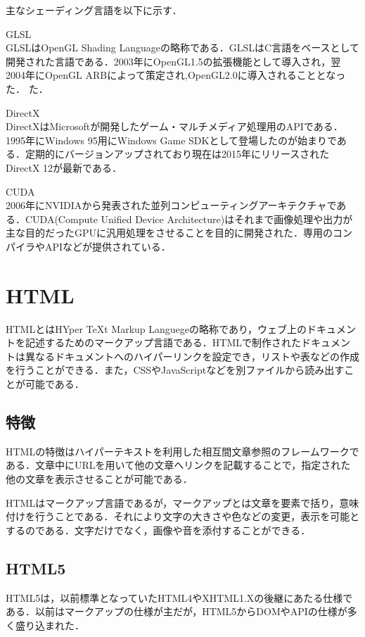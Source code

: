 \documentclass[a4j,12pt]{jsarticle}
\begin{document}
主なシェーディング言語を以下に示す．
\begin{description}
\item {GLSL}\mbox{}\\ 
GLSLはOpenGL  Shading Languageの略称である．GLSLはC言語をベースとして開発された言語である．2003年にOpenGL1.5の拡張機能として導入され，翌2004年にOpenGL ARBによって策定され,OpenGL2.0に導入されることとなった．
た．

\item	{DirectX}\mbox{}\\ 
DirectXはMicrosoftが開発したゲーム・マルチメディア処理用のAPIである．
1995年にWindows 95用にWindows Game SDKとして登場したのが始まりである．定期的にバージョンアップされており現在は2015年にリリースされたDirectX 12が最新である．

\item	{CUDA }\mbox{}\\ 
 2006年にNVIDIAから発表された並列コンピューティングアーキテクチャである．CUDA(Compute Unified Device Architecture)はそれまで画像処理や出力が主な目的だったGPUに汎用処理をさせることを目的に開発された．専用のコンパイラやAPIなどが提供されている．
\end{description}
\newpage

\section{HTML}
HTMLとはHYper TeXt Markup Languegeの略称であり，ウェブ上のドキュメントを記述するためのマークアップ言語である．HTMLで制作されたドキュメントは異なるドキュメントへのハイパーリンクを設定でき，リストや表などの作成を行うことができる．また，CSSやJavaScriptなどを別ファイルから読み出すことが可能である．
\subsection{特徴}
HTMLの特徴はハイパーテキストを利用した相互間文章参照のフレームワークである．文章中にURLを用いて他の文章へリンクを記載することで，指定された他の文章を表示させることが可能である．

HTMLはマークアップ言語であるが，マークアップとは文章を要素で括り，意味付けを行うことである．それにより文字の大きさや色などの変更，表示を可能とするのである．文字だけでなく，画像や音を添付することができる．

\subsection{HTML5}
HTML5は，以前標準となっていたHTML4やXHTML1.Xの後継にあたる仕様である．以前はマークアップの仕様が主だが，HTML5からDOMやAPIの仕様が多く盛り込まれた．
\end{document}
